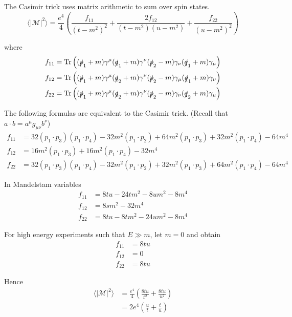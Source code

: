 The Casimir trick uses matrix arithmetic to sum over spin states.
\begin{equation*}
\langle|\mathcal{M}|^2\rangle
=
\frac{e^4}{4}
\left(
\frac{f_{11}}{(t-m^2)^2}
+\frac{2f_{12}}{(t-m^2)(u-m^2)}
+\frac{f_{22}}{(u-m^2)^2}
\right)
\end{equation*}

where
\begin{align*}
f_{11}&=\operatorname{Tr}
\left(
(\slashed{p}_1+m)\gamma^\mu(\slashed q_1+m)\gamma^\nu(\slashed p_2-m)\gamma_\nu(\slashed q_1+m)\gamma_\mu
\right)
\\
f_{12}&=\operatorname{Tr}
\left(
(\slashed{p}_1+m)\gamma^\mu(\slashed q_2+m)\gamma^\nu(\slashed p_2-m)\gamma_\mu(\slashed q_1+m)\gamma_\nu
\right)
\\
f_{22}&=\operatorname{Tr}
\left(
(\slashed{p}_1+m)\gamma^\mu(\slashed q_2+m)\gamma^\nu(\slashed p_2-m)\gamma_\nu(\slashed q_2+m)\gamma_\mu
\right)
\end{align*}

The following formulas are equivalent to the Casimir trick.
(Recall that $a\cdot b=a^\mu g_{\mu\nu}b^\nu$)
\begin{align*}
f_{11}&=
 32 (p_1 \cdot p_3) (p_1 \cdot p_4) -
 32 m^2 (p_1 \cdot p_2) +
 64 m^2 (p_1 \cdot p_3) +
 32 m^2 (p_1 \cdot p_4) - 64 m^4
\\
f_{12}&=
 16 m^2 (p_1 \cdot p_3) +
 16 m^2 (p_1 \cdot p_4) - 32 m^4
\\
f_{22}&=
 32 (p_1 \cdot p_3) (p_1 \cdot p_4) -
 32 m^2 (p_1 \cdot p_2) +
 32 m^2 (p_1 \cdot p_3) +
 64 m^2 (p_1 \cdot p_4) - 64 m^4
\end{align*}

In Mandelstam variables
\begin{align*}
f_{11}&=8 t u - 24 t m^2 - 8 u m^2 - 8 m^4
\\
f_{12}&=8 s m^2 - 32 m^4
\\
f_{22}&=8 t u - 8 t m^2 - 24 u m^2 - 8 m^4
\end{align*}

For high energy experiments such that $E\gg m$, let $m=0$ and obtain
\begin{align*}
f_{11}&=8tu
\\
f_{12}&=0
\\
f_{22}&=8tu
\end{align*}

Hence
\begin{align*}
\langle|\mathcal{M}|^2\rangle
&=
\frac{e^4}{4}
\left(
\frac{8tu}{t^2}
+\frac{8tu}{u^2}
\right)
\\
&=
2e^4
\left(
\frac{u}{t}
+\frac{t}{u}
\right)
\end{align*}

